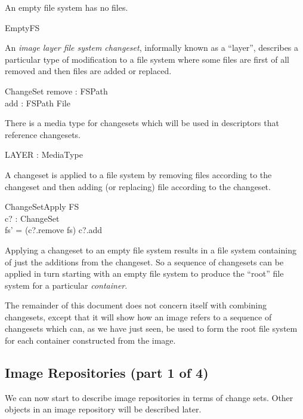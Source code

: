 \documentclass[a4paper,twoside,12pt]{article}
\begin{document}
An empty file system has no files.
\begin{zed}
  EmptyFS 
\end{zed}

An \textit{image layer file system changeset}, informally known as a ``layer'', describes a particular type of modification to a file system where some files are first of all removed and then files are added or replaced.
\begin{schema}{ChangeSet}
  remove : \power FSPath \\
  add : FSPath \pfun File \\
\end{schema}

There is a media type for changesets which will be used in descriptors that reference changesets.
\begin{axdef}
  LAYER : MediaType \\
\end{axdef}

A changeset is applied to a file system by removing files according to the changeset and then adding (or replacing) file according to the changeset.
\begin{schema}{ChangeSetApply}
  \Delta FS \\
  c? : ChangeSet \\
\where
   fs' = (c?.remove \ndres fs) \oplus c?.add \\ 
\end{schema}

Applying a changeset to an empty file system results in a file system containing of just the additions from the changeset. So a sequence of changesets can be applied in turn starting with an empty file system to produce the ``root'' file system for a particular \textit{container}.

The remainder of this document does not concern itself with combining changesets, except that it will show how an image refers to a sequence of 
changesets which can, as we have just seen, be used to form the root file system for each container constructed from the image.

\subsection{Image Repositories (part 1 of 4)}

We can now start to describe image repositories in terms of change sets. Other objects in an image repository will be described later.
\end{document}
